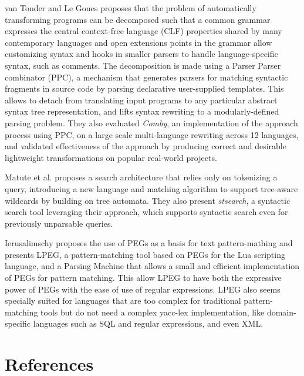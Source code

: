 \documentclass[10pt,sigplan,screen,review,anonymous]{acmart}
\begin{document}
van Tonder and Le Goues\cite{vanTonder2019-syntax-transformation-ppc} proposes
that the problem of automatically transforming programs can be decomposed such
that a common grammar expresses the central context-free language (CLF) 
properties shared by many contemporary languages and open extensions points
in the grammar allow customizing syntax and hooks in smaller parsers to handle
language-specific syntax, such as comments. The decomposition is made using a
Parser Parser combinator (PPC), a mechanism that generates parsers for matching
syntactic fragments in source code by parsing declarative user-supplied 
templates. 
This allows to detach from translating input programs to any particular 
abstract syntax tree representation, and lifts syntax rewriting to a 
modularly-defined parsing problem. 
They also evaluated \textit{Comby}, an implementation of the approach process using PPC,
on a large scale multi-language rewriting across 12 languages, and validated 
effectiveness of the approach by producing correct and desirable lightweight 
transformations on popular real-world projects.

Matute et al.\cite{matute2024-sequence-tree-matching} proposes a search
architecture that relies only on tokenizing a query, introducing a new 
language and matching algorithm to support tree-aware wildcards by building
on tree automata. They also present \textit{stsearch}, a syntactic search
tool leveraging their approach, which supports syntactic search even for
previously unparsable queries.

Ierusalimschy \cite{ierusalimschy2009-lpeg} proposes the use of PEGs as a basis
for text pattern-mathing and presents LPEG, a pattern-matching tool based on 
PEGs for the Lua scripting language, and a Parsing Machine that allows a small 
and efficient implementation of PEGs for pattern matching. 
This allow LPEG to have both the expressive power of PEGs with the ease of use 
of regular expressions.
LPEG also seems specially suited for languages that are too complex for 
traditional pattern-matching tools but do not need a complex yacc-lex 
implementation, like domain-specific languages such as SQL and regular
expressions, and even XML.

\section{References}


\end{document}
